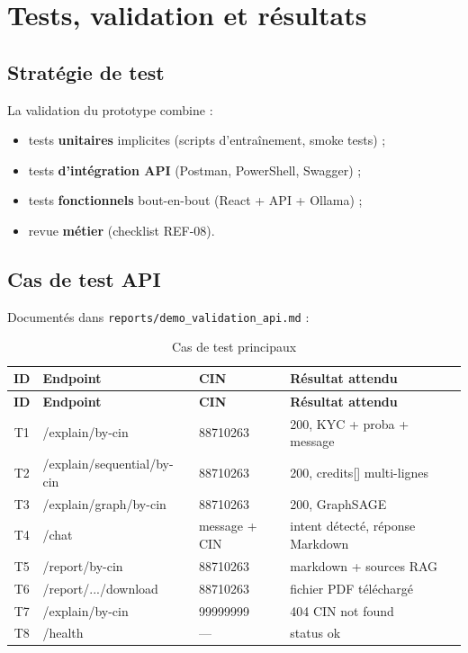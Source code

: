 \chapter{Tests, validation et résultats}
\label{ch:tests}

\section{Stratégie de test}

La validation du prototype combine :
\begin{itemize}[leftmargin=*]
  \item tests \textbf{unitaires} implicites (scripts d'entraînement, smoke tests) ;
  \item tests \textbf{d'intégration API} (Postman, PowerShell, Swagger) ;
  \item tests \textbf{fonctionnels} bout-en-bout (React + API + Ollama) ;
  \item revue \textbf{métier} (checklist REF-08).
\end{itemize}

\section{Cas de test API}

Documentés dans \texttt{reports/demo\_validation\_api.md} :

\begin{longtable}{|c|p{3.5cm}|p{3cm}|p{5cm}|}
  \caption{Cas de test principaux} \\
  \hline
  \textbf{ID} & \textbf{Endpoint} & \textbf{CIN} & \textbf{Résultat attendu} \\
  \hline
  \endfirsthead
  \hline
  \textbf{ID} & \textbf{Endpoint} & \textbf{CIN} & \textbf{Résultat attendu} \\
  \hline
  \endhead
  T1 & /explain/by-cin & 88710263 & 200, KYC + proba + message \\
  \hline
  T2 & /explain/sequential/by-cin & 88710263 & 200, credits[] multi-lignes \\
  \hline
  T3 & /explain/graph/by-cin & 88710263 & 200, GraphSAGE \\
  \hline
  T4 & /chat & message + CIN & intent détecté, réponse Markdown \\
  \hline
  T5 & /report/by-cin & 88710263 & markdown + sources RAG \\
  \hline
  T6 & /report/.../download & 88710263 & fichier PDF téléchargé \\
  \hline
  T7 & /explain/by-cin & 99999999 & 404 CIN not found \\
  \hline
  T8 & /health & --- & status ok \\
  \hline
\end{longtable}

